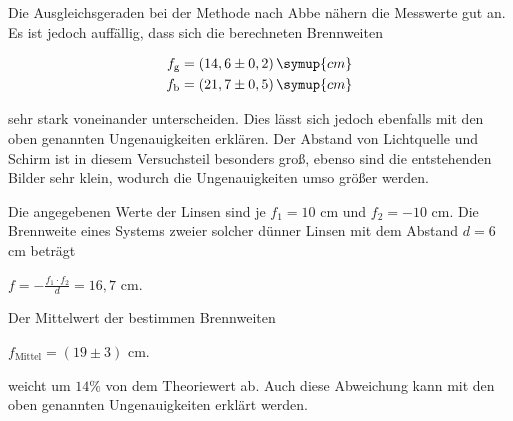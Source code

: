 Die Ausgleichsgeraden bei der Methode nach Abbe nähern die Messwerte gut an.
Es ist jedoch auffällig, dass sich die berechneten Brennweiten 

\begin{align*}
  f_\text{g} &= (14,6 \pm 0,2) \, \symup{cm}\\
  f_\text{b} &= (21,7 \pm 0,5) \, \symup{cm}
\end{align*}

sehr stark voneinander unterscheiden. Dies lässt sich jedoch ebenfalls mit den oben genannten Ungenauigkeiten erklären.
Der Abstand von Lichtquelle und Schirm ist in diesem Versuchsteil besonders groß, ebenso sind die entstehenden Bilder sehr klein, wodurch die Ungenauigkeiten umso größer werden.

Die angegebenen Werte der Linsen sind je $f_1 = 10$ cm und $f_2 = -10$ cm. Die Brennweite eines Systems zweier solcher dünner Linsen mit dem Abstand $d = 6$ cm beträgt

\begin{center}
  $f = - \frac{f_1 \cdot f_2}{d} = 16,7$ cm.
\end{center}

Der Mittelwert der bestimmen Brennweiten

\begin{center}
  $f_\text{Mittel} = (19 \pm 3)$ cm.
\end{center}

weicht um $14 \%$ von dem Theoriewert ab. Auch diese Abweichung kann mit den oben genannten Ungenauigkeiten erklärt werden.
